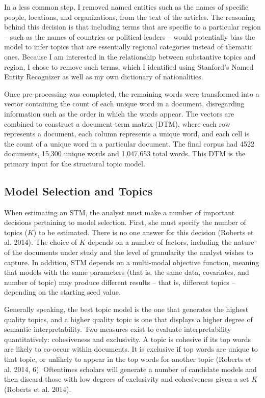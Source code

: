 \documentclass[11pt, oneside]{article}
\begin{document}
In a less common step, I removed named entities such as the names of specific people, locations, and organizations, from the text of the articles. The reasoning behind this decision is that including terms that are specific to a particular region -- such as the names of countries or political leaders -- would potentially bias the model to infer topics that are essentially regional categories instead of thematic ones. Because I am interested in the relationship between substantive topics and region, I chose to remove such terms, which I identified using Stanford's Named Entity Recognizer as well as my own dictionary of nationalities.

Once pre-processing was completed, the remaining words were transformed into a vector containing the count of each unique word in a document, disregarding information such as the order in which the words appear.  The vectors are combined to construct a document-term matrix (DTM), where each row represents a document, each column represents a unique word, and each cell is the count of a unique word in a particular document. The final corpus had 4522 documents, 15,300 unique words and 1,047,653 total words. This DTM is the primary input for the structural topic model. 
	
\subsection{Model Selection and Topics}

When estimating an STM, the analyst must make a number of important decisions pertaining to model selection. First, she must specify the number of topics ($K$) to be estimated. There is no one answer for this decision (Roberts et al. 2014). The choice of $K$ depends on a number of factors, including the nature of the documents under study and the level of granularity the analyst wishes to capture. In addition, STM depends on a multi-modal objective function, meaning that models with the same parameters (that is, the same data, covariates, and number of topic) may produce different results -- that is, different topics -- depending on the starting seed value.

Generally speaking, the best topic model is the one that generates the highest quality topics, and a higher quality topic is one that displays a higher degree of semantic interpretability. Two measures exist to evaluate interpretability quantitatively: cohesiveness and exclusivity. A topic is cohesive if its top words are likely to co-occur within documents. It is exclusive if top words are unique to that topic, or unlikely to appear in the top words for another topic (Roberts et al. 2014, 6). Oftentimes scholars will generate a number of candidate models and then discard those with low degrees of exclusivity and cohesiveness given a set $K$ (Roberts et al. 2014).
\end{document}
